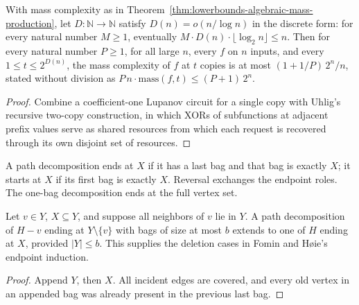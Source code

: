 \begin{theorem}
  \label{thm:lowerbounds-algebraic-uhlig}
  \leanok
  With mass complexity as in
  Theorem~\ref{thm:lowerbounds-algebraic-mass-production}, let
  $D : \mathbb{N} \to \mathbb{N}$ satisfy $D(n) = o(n / \log n)$ in the
  discrete form: for every natural number $M \ge 1$, eventually
  $M \cdot D(n) \cdot \lfloor \log_2 n \rfloor \le n$. Then for every natural
  number $P \ge 1$, for all large $n$, every $f$ on $n$ inputs, and every
  $1 \le t \le 2^{D(n)}$, the mass complexity of $f$ at $t$ copies is at most
  $(1 + 1/P)\, 2^n / n$, stated without division as
  $P\,n \cdot \mathrm{mass}(f, t) \le (P + 1)\, 2^n$.
\end{theorem}
\begin{proof}
  \leanok
  Combine a coefficient-one Lupanov circuit for a single copy with Uhlig's
  recursive two-copy construction, in which XORs of subfunctions at adjacent
  prefix values serve as shared resources from which each request is recovered
  through its own disjoint set of resources.
\end{proof}

\begin{definition}
  \label{def:lowerbounds-algebraic-path-endpoint}
  \leanok
  A path decomposition ends at $X$ if it has a last bag and that bag is
  exactly $X$; it starts at $X$ if its first bag is exactly $X$.
  Reversal exchanges the endpoint roles. The one-bag decomposition ends
  at the full vertex set.
\end{definition}

\begin{theorem}
  \label{thm:lowerbounds-algebraic-endpoint-restore}
  \leanok
  Let $v\in Y$, $X\subseteq Y$, and suppose all neighbors of $v$ lie in
  $Y$. A path decomposition of $H-v$ ending at $Y\setminus\{v\}$ with
  bags of size at most $b$ extends to one of $H$ ending at $X$, provided
  $|Y|\le b$. This supplies the deletion cases in Fomin and H{\o}ie's
  endpoint induction.
\end{theorem}
\begin{proof}
  \leanok
  Append $Y$, then $X$. All incident edges are covered, and every old
  vertex in an appended bag was already present in the previous last bag.
\end{proof}

